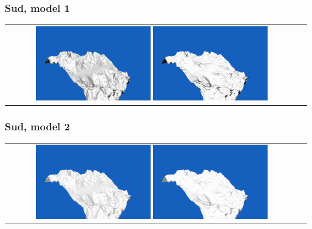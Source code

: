 \documentclass[a4paper]{article}
\begin{document}
\subsubsection{Sud, model 1}
\begin{tabular}{cc}
\includegraphics[width=0.4\textwidth]{Images/Essais/Essai_10_phong_South_0.png}
\includegraphics[width=0.4\textwidth]{Images/Essais/Essai_10_slint_South_0.png}
\end{tabular}
\subsubsection{Sud, model 2}
\begin{tabular}{cc}
\includegraphics[width=0.4\textwidth]{Images/Essais/Essai_10_phong_South_1.png}
\includegraphics[width=0.4\textwidth]{Images/Essais/Essai_10_slint_South_1.png}
\end{tabular}
\end{document}
